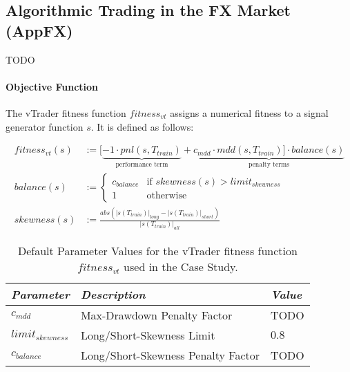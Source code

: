 \lipsum[3]

\subsection{Algorithmic Trading  in the FX Market {\sf (AppFX)}}
TODO

\paragraph{Objective Function}
The vTrader fitness function $\mathit{fitness_{vt}}$ assigns a numerical fitness to a signal
generator function $s$. It is defined as follows:

\begin{align}
  \mathit{fitness_{vt}}(s) &:= [\underbrace{-1 \cdot \mathit{pnl}(s, \mathit{T_{train}})}_\text{performance term} %
    + \underbrace{\mathit{c_{mdd}} \cdot \mathit{mdd}(s, \mathit{T_{train}})] %
    \cdot \mathit{\mathit{balance}}(s)}_\text{penalty terms} \\
  \mathit{balance}(s)      &:= %
    \begin{cases}
      \mathit{c_{balance}} & \text{if } \mathit{skewness}(s) > \mathit{limit_{skewness}} \\
      1  & \text{otherwise}
    \end{cases} \\
  \mathit{skewness}(s)     &:= \frac{\mathit{abs}(|s(\mathit{T_{train}})|_{\mathit{long}} %
    - |s(\mathit{T_{train}})|_{\mathit{short}})}{|s(\mathit{T_{train}})|_{\mathit{all}}}
\end{align}

\begin{table}[ht]
  \caption{Default Parameter Values for the vTrader fitness function $\mathit{fitness_{vt}}$ used in the Case Study.}
  \begin{tabular}{lll}
    \toprule
    {\em Parameter}             & {\em Description}                  & {\em Value} \\
    \midrule
    $\mathit{c_{mdd}}$          & Max-Drawdown Penalty Factor        & TODO        \\
    $\mathit{limit_{skewness}}$ & Long/Short-Skewness Limit          & $0.8$       \\
    $\mathit{c_{balance}}$      & Long/Short-Skewness Penalty Factor & TODO        \\
    \bottomrule
  \end{tabular}
\end{table}

